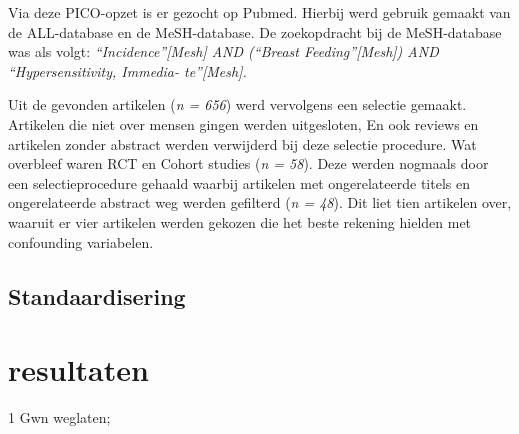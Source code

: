 \documentclass[abstract=true]{scrartcl}
\begin{document}
Via deze PICO-opzet is er gezocht op Pubmed. Hierbij werd gebruik gemaakt van de ALL-database en de MeSH-database. De zoekopdracht bij de MeSH-database was als volgt: \textit{“Incidence”[Mesh] AND (“Breast Feeding”[Mesh]) AND “Hypersensitivity, Immedia-
te”[Mesh]. }

Uit de gevonden artikelen (\textit{n = 656}) werd vervolgens een selectie gemaakt. Artikelen die niet over mensen gingen werden uitgesloten, En ook reviews en artikelen zonder abstract werden verwijderd bij deze selectie procedure. Wat overbleef waren RCT en Cohort studies (\textit{n = 58}). Deze werden nogmaals door een selectieprocedure gehaald waarbij artikelen met ongerelateerde titels en ongerelateerde abstract weg werden gefilterd (\textit{n = 48}).
Dit liet tien artikelen over, waaruit er vier artikelen werden gekozen die het beste rekening hielden met confounding variabelen.





    \subsection{Standaardisering}

\section{resultaten}
\begin{table}
   \centering
   \begin{threeparttable}
\begin{tablenotes}
\item[1]Gwn weglaten;
\end{tablenotes}

\end{threeparttable}
\label{tab:overzicht_artcls}
\end{table}
\end{document}
